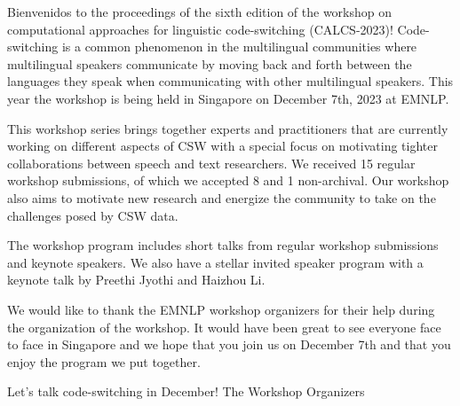 Bienvenidos to the proceedings of the sixth edition of the workshop on computational approaches for linguistic code-switching (CALCS-2023)! Code-switching is a common phenomenon in the multilingual communities where multilingual speakers communicate by moving back and forth between the languages they speak when
communicating with other multilingual speakers. This year the workshop is being held in Singapore on December 7th, 2023 at EMNLP.

This workshop series brings together experts and practitioners that are currently working on different
aspects of CSW with a special focus on motivating tighter collaborations between speech and text
researchers. We received 15 regular workshop submissions, of which we accepted 8 and 1 non-archival. Our workshop also aims to motivate new research and energize the community to take on the challenges
posed by CSW data. 

The workshop program includes short talks from regular workshop submissions and keynote speakers. We also have a stellar invited speaker program with a keynote talk by Preethi Jyothi and Haizhou Li.

We would like to thank the EMNLP workshop organizers for their help during the organization of the workshop. It would have been great to see everyone face to face in Singapore and we hope that you join us on December 7th and that you enjoy the program we put together.

Let’s talk code-switching in December!
The Workshop Organizers